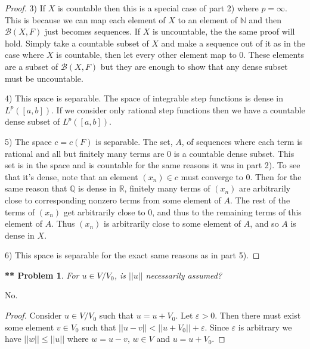 \documentclass{article}
\newtheorem{**}{** Problem}
\begin{document}
\begin{flushleft}
\begin{proof}
3) If $X$ is countable then this is a special case of part 2) where $p = \infty$. This is because we can map each element of $X$ to an element of $\mathbb{N}$ and then $\mathcal{B}(X, F)$ just becomes sequences. If $X$ is uncountable, the the same proof will hold. Simply take a countable subset of $X$ and make a sequence out of it as in the case where $X$ is countable, then let every other element map to $0$. These elements are a subset of $\mathcal{B}(X, F)$ but they are enough to show that any dense subset must be uncountable.

4) This space is separable. The space of integrable step functions is dense in $L^p([a,b])$. If we consider only rational step functions then we have a countable dense subset of $L^p([a,b])$.\newline

5) The space $c = c(F)$ is separable. The set, $A$, of sequences where each term is rational and all but finitely many terms are $0$ is a countable dense subset. This set is in the space and is countable for the same reasons it was in part 2). To see that it's dense, note that an element $(x_n) \in c$ must converge to $0$. Then for the same reason that $\mathbb{Q}$ is dense in $\mathbb{R}$, finitely many terms of $(x_n)$ are arbitrarily close to corresponding nonzero terms from some element of $A$. The rest of the terms of $(x_n)$ get arbitrarily close to $0$, and thus to the remaining terms of this element of $A$. Thus $(x_n)$ is arbitrarily close to some element of $A$, and so $A$ is dense in $X$.\newline

6) This space is separable for the exact same reasons as in part 5).
\end{proof}

\begin{**}
For $u \in V / V_0$, is $||u||$ necessarily assumed?
\end{**}

No.
\begin{proof}
Consider $u \in V / V_0$ such that $u = u + V_0$. Let $\varepsilon > 0$. Then there must exist some element $v \in V_0$ such that $||u - v|| < ||u + V_0|| + \varepsilon$. Since $\varepsilon$ is arbitrary we have $||w|| \leq ||u||$ where $w = u-v$, $w \in V$ and $u = u + V_0$.
\end{proof}


\end{flushleft}
\end{document}
